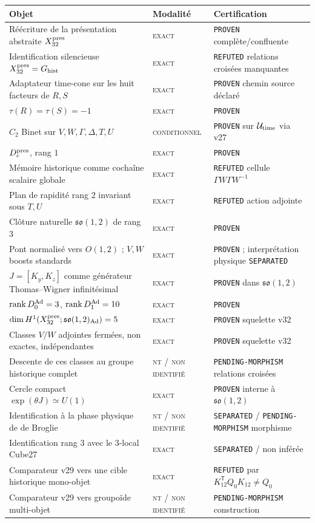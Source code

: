 \documentclass[11pt,a4paper]{article}
\newcommand{\rank}{\operatorname{rank}}
\newcommand{\statusExact}{\textsc{exact}}
\newcommand{\statusCond}{\textsc{conditionnel}}
\newcommand{\statusNT}{\textsc{nt / non identifié}}
\newcommand{\certProven}{\texttt{PROVEN}}
\newcommand{\certRefuted}{\texttt{REFUTED}}
\newcommand{\certSeparated}{\texttt{SEPARATED}}
\newcommand{\certPending}{\texttt{PENDING-MORPHISM}}
\begin{document}
\begin{longtable}{p{}p{}p{}}
\toprule
Objet & Modalité & Certification\\
\midrule
\endhead
Réécriture de la présentation abstraite $X_{32}^{\rm pres}$ & \statusExact & \certProven{} complète/confluente\\
Identification silencieuse $X_{32}^{\rm pres}=G_{\rm hist}$ & \statusExact & \certRefuted{} relations croisées manquantes\\
Adaptateur time-cone sur les huit facteurs de $R,S$ & \statusExact & \certProven{} chemin source déclaré\\
$\tau(R)=\tau(S)=-1$ & \statusExact & \certProven\\
$C_2$ Binet sur $V,W,\Gamma,\Delta,T,U$ & \statusCond & \certProven{} sur $\mathcal U_{\rm time}$ via v27\\
$D_c^{\rm pres}$, rang $1$ & \statusExact & \certProven\\
Mémoire historique comme cochaîne scalaire globale & \statusExact & \certRefuted{} cellule $\Gamma W\Gamma W^{-1}$\\
Plan de rapidité rang $2$ invariant sous $T,U$ & \statusExact & \certRefuted{} action adjointe\\
Clôture naturelle $\mathfrak{so}(1,2)$ de rang $3$ & \statusExact & \certProven\\
Pont normalisé vers $O(1,2)$ ; $V,W$ boosts standards & \statusExact & \certProven{} ; interprétation physique \certSeparated\\
$J=[K_y,K_z]$ comme générateur Thomas--Wigner infinitésimal & \statusExact & \certProven{} dans $\mathfrak{so}(1,2)$\\
$\rank D_0^{\rm Ad}=3$, $\rank D_1^{\rm Ad}=10$ & \statusExact & \certProven\\
$\dim H^1(X_{32}^{\rm pres};\mathfrak{so}(1,2)_{\rm Ad})=5$ & \statusExact & \certProven{} squelette v32\\
Classes $V/W$ adjointes fermées, non exactes, indépendantes & \statusExact & \certProven{} squelette v32\\
Descente de ces classes au groupe historique complet & \statusNT & \certPending{} relations croisées\\
Cercle compact $\exp(\theta J)\simeq U(1)$ & \statusExact & \certProven{} interne à $\mathfrak{so}(1,2)$\\
Identification à la phase physique de de Broglie & \statusNT & \certSeparated{} / \certPending{} morphisme\\
Identification rang $3$ avec le $3$-local Cube27 & \statusExact & \certSeparated{} / non inférée\\
Comparateur v29 vers une cible historique mono-objet & \statusExact & \certRefuted{} par $K_{12}^{\mathsf T}Q_0K_{12}\neq Q_0$\\
Comparateur v29 vers groupoïde multi-objet & \statusNT & \certPending{} construction\\
\bottomrule
\end{longtable}
\end{document}
